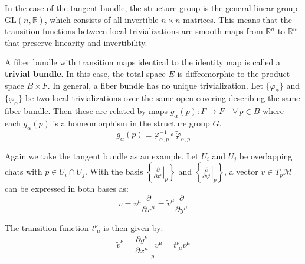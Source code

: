 In the case of the tangent bundle, the structure group is the general linear group $\mathrm{GL}(n, \mathbb{R})$, which consists of all invertible $n \times n$ matrices. This means that the transition functions between local trivializations are smooth maps from $\mathbb{R}^n$ to $\mathbb{R}^n$ that preserve linearity and invertibility.

A fiber bundle with transition maps identical to the identity map is called a \textbf{trivial bundle}. In this case, the total space $E$ is diffeomorphic to the product space $B \times F$.
In general, a fiber bundle has no unique trivialization. Let $\{\varphi_\alpha\}$ and $\{\tilde{\varphi}_\alpha\}$ be two local trivializations over the same open covering describing the same fiber bundle. Then these are related by maps $g_\alpha(p) : F \to F \quad \forall\, p \in B$ where each $g_\alpha(p)$ is a homeomorphism in the structure group $G$.
\[
g_\alpha(p) \equiv \varphi_{\alpha,p}^{-1} \circ \tilde{\varphi}_{\alpha,p}
\]


Again we take the tangent bundle as an example. Let $U_i$ and $U_j$ be overlapping chats with $p \in U_i \cap U_j$. With the basis $\left\{ \left. \frac{\partial}{\partial x^i} \right|_p \right\}$ and $\left\{ \left. \frac{\partial}{\partial y^j} \right|_p \right\}$, a vector $v \in T_p\mathcal{M}$ can be expressed in both bases as:
\[
v = v^{\mu} \frac{\partial}{\partial x^{\mu}} = \tilde{v}^{\mu} \frac{\partial}{\partial y^{\mu}}
\]

The transition function $t^\nu_{\,\,\mu}$ is then given by:
\[ \tilde{v}^\nu = \left.\frac{\partial y^\nu}{\partial x^\mu}\right|_p v^\mu = t^\nu_{\,\,\mu}v^\mu \]

